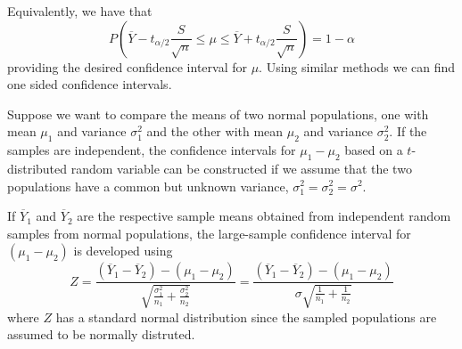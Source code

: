 \documentclass[12pt, a4paper, twoside, openright, titlepage]{book}
\begin{document}
Equivalently, we have that \begin{equation*}
    P(\overline{Y} - t_{\alpha/2}\frac{S}{\sqrt{n}} \leq \mu \leq \overline{Y} + t_{\alpha/2}\frac{S}{\sqrt{n}}) = 1-\alpha
\end{equation*}
providing the desired confidence interval for $\mu$. Using similar methods we can find one sided confidence intervals.

\vspace{15pt}

Suppose we want to compare the means of two normal populations, one with mean $\mu_1$ and variance $\sigma_1^2$ and the other with mean $\mu_2$ and variance $\sigma_2^2$. If the samples are independent, the confidence intervals for $\mu_1-\mu_2$ based on a $t$-distributed random variable can be constructed if we assume that the two populations have a common but unknown variance, $\sigma_1^2 = \sigma_2^2 = \sigma^2$.


If $\overline{Y}_1$ and $\overline{Y}_2$ are the respective sample means obtained from independent random samples from normal populations, the large-sample confidence interval for $(\mu_1 - \mu_2)$ is developed using \begin{equation*}
    Z = \frac{(\overline{Y}_1 - \overline{Y}_2) - (\mu_1 - \mu_2)}{\sqrt{\frac{\sigma_1^2}{n_1} + \frac{\sigma_2^2}{n_2}}} = \frac{(\overline{Y}_1 - \overline{Y}_2) - (\mu_1 - \mu_2)}{\sigma\sqrt{\frac{1}{n_1} + \frac{1}{n_2}}}
\end{equation*}
where $Z$ has a standard normal distribution since the sampled populations are assumed to be normally distruted.
\end{document}
